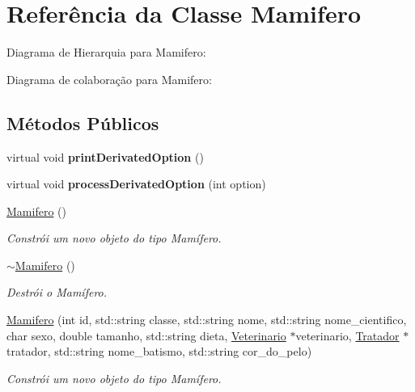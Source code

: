 \hypertarget{classMamifero}{}\section{Referência da Classe Mamifero}
\label{classMamifero}


Diagrama de Hierarquia para Mamifero\+:


Diagrama de colaboração para Mamifero\+:
\subsection*{Métodos Públicos}
\begin{DoxyCompactItemize}
\item 
\mbox{\label{classMamifero_a5780d6cf5368aadbaf2e1e1396392ec8}} 
virtual void {\bfseries print\+Derivated\+Option} ()
\item 
\mbox{\label{classMamifero_a1f3a8df85abec85bcf4177ab47a0a8dc}} 
virtual void {\bfseries process\+Derivated\+Option} (int option)
\item 
\mbox{\label{classMamifero_adc6af2531b40fb6b0bc91cb5bbb205e8}} 
\hyperlink{classMamifero_adc6af2531b40fb6b0bc91cb5bbb205e8}{Mamifero} ()
\begin{DoxyCompactList}\small\item\em Constrói um novo objeto do tipo Mamífero. \end{DoxyCompactList}\item 
\mbox{\label{classMamifero_a56eb196d45222e754eb6f19000667d5d}} 
\hyperlink{classMamifero_a56eb196d45222e754eb6f19000667d5d}{$\sim$\+Mamifero} ()
\begin{DoxyCompactList}\small\item\em Destrói o Mamífero. \end{DoxyCompactList}\item 
\hyperlink{classMamifero_a7f460155291cfc4ceea97bd74cc9e763}{Mamifero} (int id, std\+::string classe, std\+::string nome, std\+::string nome\+\_\+cientifico, char sexo, double tamanho, std\+::string dieta, \hyperlink{classVeterinario}{Veterinario} $\ast$veterinario, \hyperlink{classTratador}{Tratador} $\ast$tratador, std\+::string nome\+\_\+batismo, std\+::string cor\+\_\+do\+\_\+pelo)
\begin{DoxyCompactList}\small\item\em Constrói um novo objeto do tipo Mamífero. \end{DoxyCompactList}\item 

\end{DoxyCompactItemize}
